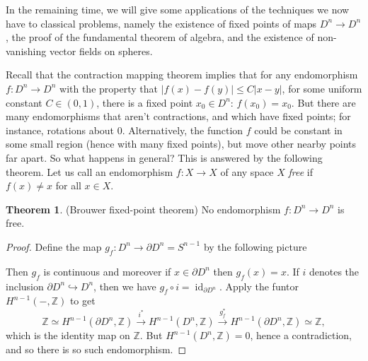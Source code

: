 \documentclass{tufte-handout}
\def\into {\hookrightarrow}
\def\ZZ{\mathbb{Z}}
\newcommand{\lecturenum}[1]{\marginnote{\color{red}Lecture #1}}
\DeclareMathOperator{\id}{id}
\theoremstyle{definition}
\newtheorem{theorem}{Theorem}
\begin{document}
In\lecturenum{30} the remaining time, we will give some applications of the techniques we now have to classical problems, namely the existence of fixed points of maps $D^n\to D^n$, the proof of the fundamental theorem of algebra, and the existence of non-vanishing vector fields on spheres.

Recall that the contraction mapping theorem implies that for any endomorphism $f\colon D^n \to D^n$ with the property that $|f(x)-f(y)| \leq C |x-y|$, for some uniform constant $C\in (0,1)$, there is a fixed point $x_0\in D^n$: $f(x_0) = x_0$. But there are many endomorphisms that aren't contractions, and which have fixed points; for instance, rotations about $0$. Alternatively, the function $f$ could be constant in some small region (hence with many fixed points), but move other nearby points far apart. So what happens in general? This is answered by the following theorem. Let us call an endomorphism $f\colon X \to X$ of any space $X$ \emph{free} if $f(x)\neq x$ for all $x\in X$.

\begin{theorem}{(Brouwer fixed-point theorem)}
No endomorphism $f\colon D^n\to D^n$ is free.
\end{theorem}

\begin{proof}
Define the map $g_f\colon D^n \to \partial D^n = S^{n-1}$ by the following picture
\begin{center}

\end{center}

Then $g_f$ is continuous and moreover if $x\in \partial D^n$ then $g_f(x)=x$. If $i$ denotes the inclusion $\partial D^n \into D^n$, then we have $g_f\circ i = \id_{\partial D^n}$. Apply the funtor $H^{n-1}(-,\ZZ)$ to get
\[
	\ZZ \simeq H^{n-1}(\partial D^n,\ZZ) \xrightarrow{i^*} H^{n-1}(D^n,\ZZ) \xrightarrow{g_f^*} H^{n-1}(\partial D^n,\ZZ) \simeq \ZZ,
\]
which is the identity map on $\ZZ$. But $H^{n-1}(D^n,\ZZ) =0$, hence a contradiction, and so there is so such endomorphism.
\end{proof}
\end{document}
